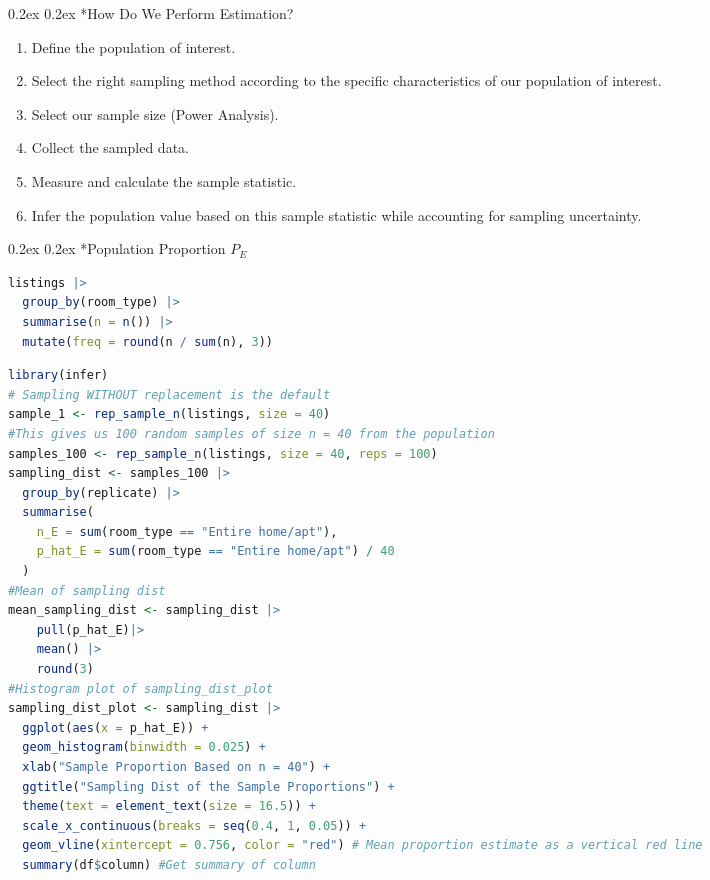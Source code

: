 \documentclass[8pt,landscape]{article}
\makeatletter
\renewcommand{\subsection}{\@startsection{subsection}{2}{0pt}%
    {0.2ex}%
    {0.2ex}%
    {\fontsize{8}{8}\bfseries\color{blue}}} %
\makeatother
\begin{document}
\pagestyle{empty}
\begin{multicols}{3}
\subsection*{How Do We Perform Estimation?}
\begin{enumerate}\fontsize{8}{8}\selectfont
    \item Define the population of interest.
    \item Select the right sampling method according to the specific characteristics of our population of interest.
    \item Select our sample size (Power Analysis).
    \item Collect the sampled data.
    \item Measure and calculate the sample statistic.
    \item Infer the population value based on this sample statistic while accounting for sampling uncertainty.
\end{enumerate}

\subsection*{Population Proportion ${P}_E$}
\begin{lstlisting}[language=R]
listings |>
  group_by(room_type) |>
  summarise(n = n()) |>
  mutate(freq = round(n / sum(n), 3))
\end{lstlisting}
\begin{lstlisting}[language=R]
library(infer)
# Sampling WITHOUT replacement is the default
sample_1 <- rep_sample_n(listings, size = 40) 
#This gives us 100 random samples of size n = 40 from the population
samples_100 <- rep_sample_n(listings, size = 40, reps = 100) 
sampling_dist <- samples_100 |>
  group_by(replicate) |>
  summarise(
    n_E = sum(room_type == "Entire home/apt"),
    p_hat_E = sum(room_type == "Entire home/apt") / 40
  )
#Mean of sampling dist
mean_sampling_dist <- sampling_dist |>
    pull(p_hat_E)|>
    mean() |>
    round(3)
#Histogram plot of sampling_dist_plot
sampling_dist_plot <- sampling_dist |>
  ggplot(aes(x = p_hat_E)) +
  geom_histogram(binwidth = 0.025) +
  xlab("Sample Proportion Based on n = 40") +
  ggtitle("Sampling Dist of the Sample Proportions") +
  theme(text = element_text(size = 16.5)) +
  scale_x_continuous(breaks = seq(0.4, 1, 0.05)) +
  geom_vline(xintercept = 0.756, color = "red") # Mean proportion estimate as a vertical red line
  summary(df$column) #Get summary of column
\end{lstlisting}


\end{multicols}
\end{document}

